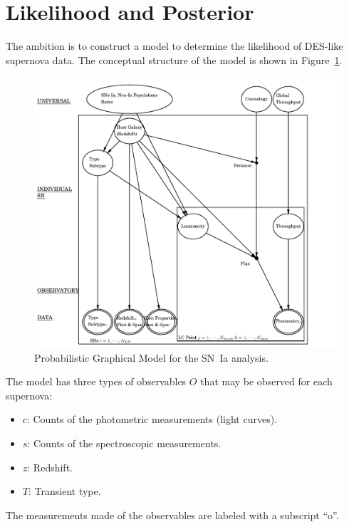 \documentclass[preprint,3p]{elsarticle}
\begin{document}
%
%

\section{Likelihood and Posterior}
\label{likelihood:sec}

The ambition is to construct a model to determine the likelihood of DES-like
supernova data. 
The conceptual structure of the model is shown in Figure~\ref{pgm:fig}. 
\begin{figure}[htbp] %
   \centering
   \includegraphics[width=6.5in]{../results//hdpgm.pdf} 
   \caption{Probabilistic Graphical Model for the SN~Ia analysis.  
   \label{pgm:fig}}
\end{figure}

The model has three types of observables $O$ that
may be observed for each supernova:
\begin{itemize}
\item $c$: Counts of the photometric measurements (light curves).
\item $s$: Counts of the spectroscopic measurements.
\item $z$: Redshift.
\item $T$: Transient type.
\end{itemize}
The measurements made of the observables are labeled  with a subscript ``o''.
\end{document}
